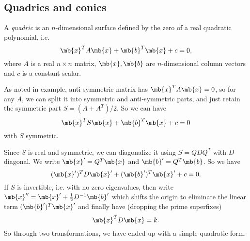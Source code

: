 \documentclass[a4paper]{article}
\begin{document}
\subsection{Quadrics and conics}

\begin{defi}[Quadric]
  A \emph{quadric} is an $n$-dimensional surface defined by the zero of a real quadratic polynomial, i.e.
\[
\mb{x}^T A\mb{x} + \mb{b}^T\mb{x} + c = 0,
\]
where $A$ is a real $n\times n$ matrix, $\mb{x}, \mb{b}$ are $n$-dimensional column vectors and $c$ is a constant scalar.
\end{defi}

As noted in example, anti-symmetric matrix has $\mb{x}^TA\mb{x} = 0$, so for any $A$, we can split it into symmetric and anti-symmetric parts, and just retain the symmetric part $S = (A + A^T)/2$. So we can have
\[
\mb{x}^T S\mb{x} + \mb{b}^T\mb{x} + c = 0
\]
with $S$ symmetric.

Since $S$ is real and symmetric, we can diagonalize it using $S = QDQ^T$ with $D$ diagonal. We write $\mb{x}' = Q^T \mb{x}$ and $\mb{b}' = Q^T \mb{b}$. So we have
\[
(\mb{x}')^TD\mb{x}' + (\mb{b}')^T \mb{x}' + c = 0.
\]
If $S$ is invertible, i.e. with no zero eigenvalues, then write $\mb{x}'' = \mb{x}' + \frac{1}{2}D^{-1}\mb{b}'$ which shifts the origin to eliminate the linear term $(\mb{b}')^T\mb{x}'$ and finally have (dropping the prime superfixes)
\[
\mb{x}^TD\mb{x} = k.
\]
So through two transformations, we have ended up with a simple quadratic form.
\end{document}

